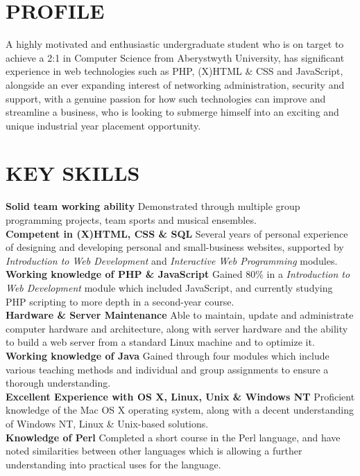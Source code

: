 \documentclass[line,margin]{res}
\begin{document}
\address{61 Jim Driscoll Way, Cardiff, CF11 7JL}
\address{+44 (0) 78927 18071\\me@edparry.com\\edparry.com}

 
\begin{resume}
 
\section{PROFILE}A highly motivated and enthusiastic undergraduate student who is on target to achieve a 2:1 in Computer Science from Aberystwyth University, has significant experience in web technologies such as PHP, (X)HTML \& CSS and JavaScript, alongside an ever expanding interest of networking administration, security and support, with a genuine passion for how such technologies can improve and streamline a business, who is looking to submerge himself into an exciting and unique industrial year placement opportunity.
 

\section{KEY SKILLS}
{\bf Solid team working ability} Demonstrated through multiple group programming projects, team sports and musical ensembles.\\
{\bf Competent in (X)HTML, CSS \& SQL} Several years of personal experience of designing and developing personal and small-business websites, supported by {\sl Introduction to Web Development} and {\sl Interactive Web Programming} modules.\\
{\bf Working knowledge of PHP \& JavaScript} Gained 80\% in a {\sl Introduction to Web Development} module which included JavaScript, and currently studying PHP scripting to more depth in a second-year course.\\
{\bf Hardware \& Server Maintenance} Able to maintain, update and administrate computer hardware and architecture, along with server hardware and the ability to build a web server from a standard Linux machine and to optimize it.\\
{\bf Working knowledge of Java} Gained through four modules which include various teaching methods and individual and group assignments to ensure a thorough understanding.\\
{\bf Excellent Experience with OS X, Linux, Unix \& Windows NT} Proficient knowledge of the Mac OS X operating system, along with a decent understanding of Windows NT, Linux \& Unix-based solutions.\\
{\bf Knowledge of Perl} Completed a short course in the Perl language, and have noted similarities between other languages which is allowing a further understanding into practical uses for the language.
 

\end{resume}
\end{document}
